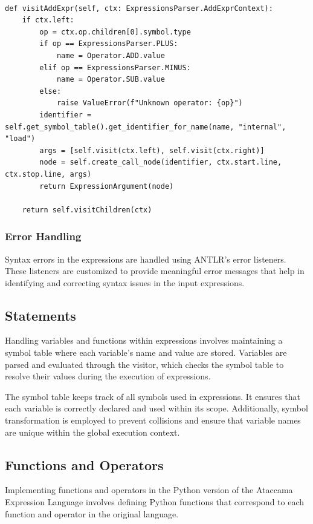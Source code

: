 \begin{verbatim}
    
def visitAddExpr(self, ctx: ExpressionsParser.AddExprContext):
    if ctx.left:
        op = ctx.op.children[0].symbol.type
        if op == ExpressionsParser.PLUS:
            name = Operator.ADD.value
        elif op == ExpressionsParser.MINUS:
            name = Operator.SUB.value
        else:
            raise ValueError(f"Unknown operator: {op}")
        identifier = self.get_symbol_table().get_identifier_for_name(name, "internal", "load")
        args = [self.visit(ctx.left), self.visit(ctx.right)]
        node = self.create_call_node(identifier, ctx.start.line, ctx.stop.line, args)
        return ExpressionArgument(node)

    return self.visitChildren(ctx)

\end{verbatim}

\subsubsection{Error Handling}

Syntax errors in the expressions are handled using ANTLR's error listeners. These listeners are customized to provide meaningful error messages that help in identifying and correcting syntax issues in the input expressions.

\subsection{Statements}

Handling variables and functions within expressions involves maintaining a symbol table where each variable's name and value are stored. Variables are parsed and evaluated through the visitor, which checks the symbol table to resolve their values during the execution of expressions.

 The symbol table keeps track of all symbols used in expressions. It ensures that each variable is correctly declared and used within its scope. Additionally, symbol transformation is employed to prevent collisions and ensure that variable names are unique within the global execution context.

 \subsection{Functions and Operators}

Implementing functions and operators in the Python version of the Ataccama Expression Language involves defining Python functions that correspond to each function and operator in the original language.

